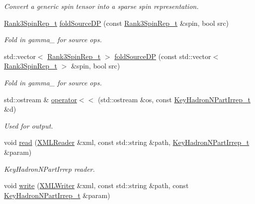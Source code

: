 \begin{DoxyCompactItemize}
\begin{DoxyCompactList}\small\item\em Convert a generic spin tensor into a sparse spin representation. \end{DoxyCompactList}\item 
\mbox{\hyperlink{structHadron_1_1Rank3SpinRep__t}{Rank3\+Spin\+Rep\+\_\+t}} \mbox{\hyperlink{namespaceHadron_a9a1884dbfb0a2eb11bd7d4e6585e6966}{fold\+Source\+DP}} (const \mbox{\hyperlink{structHadron_1_1Rank3SpinRep__t}{Rank3\+Spin\+Rep\+\_\+t}} \&spin, bool src)
\begin{DoxyCompactList}\small\item\em Fold in gamma\+\_ for source ops. \end{DoxyCompactList}\item 
std\+::vector$<$ \mbox{\hyperlink{structHadron_1_1Rank3SpinRep__t}{Rank3\+Spin\+Rep\+\_\+t}} $>$ \mbox{\hyperlink{namespaceHadron_a121d64f8eb61ea3fc51116de1c659ee5}{fold\+Source\+DP}} (const std\+::vector$<$ \mbox{\hyperlink{structHadron_1_1Rank3SpinRep__t}{Rank3\+Spin\+Rep\+\_\+t}} $>$ \&spin, bool src)
\begin{DoxyCompactList}\small\item\em Fold in gamma\+\_ for source ops. \end{DoxyCompactList}\item 
std\+::ostream \& \mbox{\hyperlink{namespaceHadron_a8b41635ad70840ac7fc9ebff331876e4}{operator$<$$<$}} (std\+::ostream \&os, const \mbox{\hyperlink{structHadron_1_1KeyHadronNPartIrrep__t}{Key\+Hadron\+N\+Part\+Irrep\+\_\+t}} \&d)
\begin{DoxyCompactList}\small\item\em Used for output. \end{DoxyCompactList}\item 
void \mbox{\hyperlink{namespaceHadron_a9e39323c40f07b97b83923c9bfd452b3}{read}} (\mbox{\hyperlink{classADATXML_1_1XMLReader}{X\+M\+L\+Reader}} \&xml, const std\+::string \&path, \mbox{\hyperlink{structHadron_1_1KeyHadronNPartIrrep__t}{Key\+Hadron\+N\+Part\+Irrep\+\_\+t}} \&param)
\begin{DoxyCompactList}\small\item\em Key\+Hadron\+N\+Part\+Irrep reader. \end{DoxyCompactList}\item 
void \mbox{\hyperlink{namespaceHadron_a649265e2213fc38a7907196da52300cd}{write}} (\mbox{\hyperlink{classADATXML_1_1XMLWriter}{X\+M\+L\+Writer}} \&xml, const std\+::string \&path, const \mbox{\hyperlink{structHadron_1_1KeyHadronNPartIrrep__t}{Key\+Hadron\+N\+Part\+Irrep\+\_\+t}} \&param)

\end{DoxyCompactItemize}
